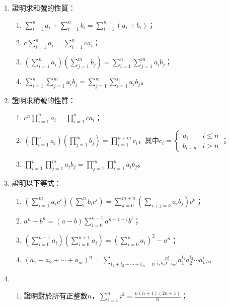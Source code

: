 \documentclass[12pt]{article}
\begin{document}
    \begin{enumerate}
        \item 證明求和號的性質：\begin{enumerate}
            \item $\displaystyle\sum_{i=1}^{n}a_i+\sum_{i=1}^{n}b_i=\sum_{i=1}^{n}(a_i+b_i)$；
            \item $\displaystyle c\sum_{i=1}^{n}a_i=\sum_{i=1}^{n}ca_i$；
            \item $\displaystyle (\sum_{i=1}^{n}a_i)(\sum_{j=1}^{m}b_j)=\sum_{i=1}^{n}\sum_{j=1}^{m}a_ib_j$；
            \item $\displaystyle \sum_{i=1}^{n}\sum_{j=1}^{m}a_ib_j=\sum_{j=1}^{m}\sum_{i=1}^{n}a_ib_j$。
        \end{enumerate}
        \item 證明求積號的性質：\begin{enumerate}
            \item $\displaystyle c^n\prod_{i=1}^{n}a_i=\prod_{i=1}^{n}ca_i$；
            \item $\displaystyle (\prod_{i=1}^{n}a_i)(\prod_{j=1}^{m}b_j)=\prod_{i=1}^{n+m}c_i$，其中$c_i=\begin{cases}
                a_i&i\leq n\\
                b_{i-n}&i>n 
            \end{cases}$；
            \item $\displaystyle \prod_{i=1}^{n}\prod_{j=1}^{m}a_ib_j=\prod_{j=1}^{m}\prod_{i=1}^{n}a_ib_j$。
        \end{enumerate}
        \item 證明以下等式：\begin{enumerate}
            \item $\displaystyle(\sum_{i=1}^{m}a_ic^i)(\sum_{i}^{n}b_ic^i)=\sum_{k=0}^{m+n}(\sum_{i+j=k}a_ib_j)c^k$；
            \item $\displaystyle a^n-b^n=(a-b)\sum_{i=0}^{n-1}a^{n-1-i}b^i$；
            \item $\displaystyle (\sum_{i=0}^{n-1}a_i)(\sum_{i=0}^{n+1}a_i)=(\sum_{i=0}^{n}a_i)^2-a^n$；
            \item $\displaystyle (a_1+a_2+\cdots+a_m)^n=\sum_{i_1+i_2+\cdots+i_m=n}\frac{n!}{i_1!i_2!\cdots i_m!}a_1^{i_1}a_2^{i_2}\cdots a_m^{i_m}$。
        \end{enumerate}
        \item \begin{enumerate}
            \item 證明對於所有正整數$n$，$\displaystyle \sum_{i=1}^{n}i^2=\frac{n(n+1)(2n+1)}{6}$；

\end{enumerate}
\end{enumerate}
\end{document}
